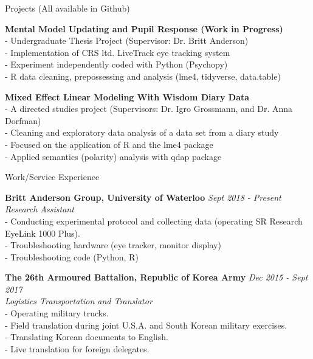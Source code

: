 \documentclass{resume} %
\begin{document}
\begin{rSection}{Projects (All available in Github)}

	{\bf Mental Model Updating and Pupil Response (Work in Progress)}
	\\- Undergraduate Thesis Project (Supervisor: Dr. Britt Anderson)
	\\- Implementation of CRS ltd. LiveTrack eye tracking system
	\\- Experiment independently coded with Python (Psychopy)
	\\- R data cleaning, prepossessing and analysis (lme4, tidyverse, data.table)
	
	{\bf Mixed Effect Linear Modeling With Wisdom Diary Data}
	\\- A directed studies project (Supervisors: Dr. Igro Grossmann, and Dr. Anna Dorfman)
	\\- Cleaning and exploratory data analysis of a data set from a diary study
	\\- Focused on the application of R and the lme4 package
	\\- Applied semantics (polarity) analysis with qdap package

\end{rSection}


\begin{rSection}{Work/Service Experience}

	{\bf Britt Anderson Group, University of Waterloo} \hfill {\em Sept 2018 - Present} 
	\\{\textit{Research Assistant}}
	\\- Conducting experimental protocol and collecting data (operating SR Research EyeLink 1000 Plus).
	\\- Troubleshooting hardware (eye tracker, monitor display)
	\\- Troubleshooting code (Python, R)
	
	
	{\bf The 26th Armoured Battalion, Republic of Korea Army} \hfill {\em Dec 2015 - Sept 2017} 
	\\{\textit{Logistics Transportation and Translator}}
	\\- Operating military trucks.
	\\- Field translation during joint U.S.A. and South Korean military exercises.
	\\- Translating Korean documents to English.
	\\- Live translation for foreign delegates.

\end{rSection}
\end{document}
